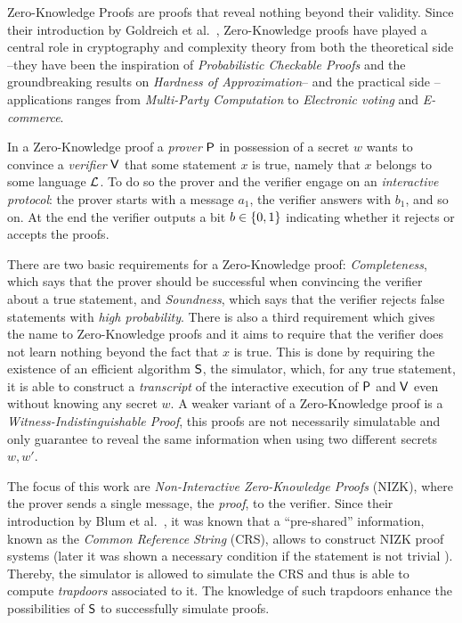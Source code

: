 Zero-Knowledge Proofs are proofs that reveal nothing beyond their validity. Since their introduction by Goldreich et al.~\cite{GolMicRac89}, Zero-Knowledge proofs have played a central role in cryptography and complexity theory from both the theoretical side --they have been the inspiration of \emph{Probabilistic Checkable Proofs} and the groundbreaking results on \emph{Hardness of Approximation}-- and the practical side --applications ranges from \emph{Multi-Party Computation} to \emph{Electronic voting} and \emph{E-commerce}.

In a Zero-Knowledge proof a \emph{prover} $\mathsf{P}$ in possession of a secret $w$ wants to convince a \emph{verifier} $\mathsf{V}$ that some statement $x$ is true, namely that $x$ belongs to some language $\mathcal{L}$. To do so the prover and the verifier engage on an \emph{interactive protocol}: the prover starts with a message $a_1$, the verifier answers with $b_1$, and so on. At the end the verifier outputs a bit $b\in\{0,1\}$ indicating whether it rejects or accepts the proofs.

There are two basic requirements for a Zero-Knowledge proof: \emph{Completeness}, which says that the prover should be successful when convincing the verifier about a true statement, and \emph{Soundness}, which says that the verifier rejects false statements with \emph{high probability}. There is also a third requirement which  gives the name to Zero-Knowledge proofs and it aims to require that the verifier does not learn nothing beyond the fact that $x$ is true. This is done by requiring the existence of an efficient algorithm $\mathsf{S}$, the simulator, which, for any true statement, it is able to construct a \emph{transcript} of the interactive execution of $\mathsf{P}$ and $\mathsf{V}$ even without knowing any secret $w$.
A weaker variant of a Zero-Knowledge proof is a \emph{Witness-Indistinguishable Proof}, this proofs are not necessarily simulatable and only guarantee to reveal the same information when using two different secrets $w,w'$. 

The focus of this work are \emph{Non-Interactive Zero-Knowledge Proofs} (NIZK), where the prover sends a single message, the \emph{proof}, to the verifier. Since their introduction by Blum et al.~\cite{STOC:BluFelMic88}, it was known that a ``pre-shared'' information, known as the \emph{Common Reference String} (CRS), allows to construct NIZK proof systems (later it was shown a necessary condition if the statement is not trivial \cite{JC:GolOre94}). Thereby, the simulator is allowed to simulate the CRS and thus is able to compute \emph{trapdoors} associated to it. The knowledge of such trapdoors enhance the possibilities of $\mathsf{S}$ to successfully simulate proofs.

